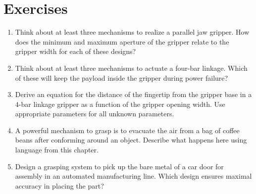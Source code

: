 \section*{Exercises}\small
\begin{enumerate}
\item Think about at least three mechanisms to realize a parallel jaw gripper. How does the minimum and maximum aperture of the gripper relate to the gripper width for each of these designs?
\item Think about at least three mechanisms to actuate a four-bar linkage. Which of these will keep the payload inside the gripper during power failure?
\item Derive an equation for the distance of the fingertip from the gripper base in a 4-bar linkage gripper as a function of the gripper opening width. Use appropriate parameters for all unknown parameters.
\item A powerful mechanism to grasp is to evacuate the air from a bag of coffee beans after conforming around an object. Describe what happens here using language from this chapter.
\item Design a grasping system to pick up the bare metal of a car door for assembly in an automated manufacturing line. Which design ensures maximal accuracy in placing the part? 
\end{enumerate}\normalsize
